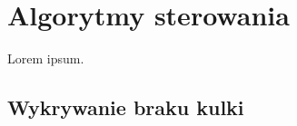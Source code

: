 \chapter{Algorytmy sterowania}
\label{cha:ch7_algorytmy_sterowania}

Lorem ipsum.

\section{Wykrywanie braku kulki}
\label{sec:ch7_wykrywanie_braku_kulki}

